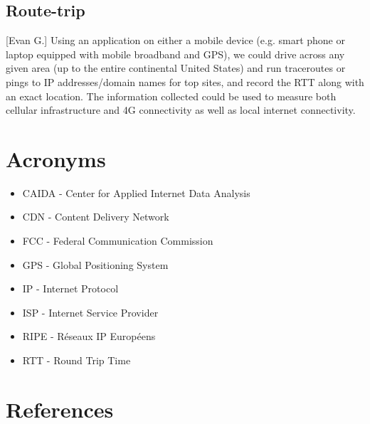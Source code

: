 \documentclass[12pt]{article}
\begin{document}
\subsection{Route-trip}[Evan G.]
Using an application on either a mobile device (e.g. smart phone or laptop equipped with mobile broadband and GPS), we could drive across any given area (up to the entire continental United States) and run traceroutes or pings to IP addresses/domain names for top sites, and record the RTT along with an exact location. The information collected could be used to measure both cellular infrastructure and 4G connectivity as well as local internet connectivity.

\newpage
\section{Acronyms}
\begin{itemize}
    \item CAIDA - Center for Applied Internet Data Analysis
    \item CDN - Content Delivery Network
    \item FCC - Federal Communication Commission
    \item GPS - Global Positioning System
    \item IP  - Internet Protocol
    \item ISP - Internet Service Provider
    \item RIPE - R\'eseaux IP Europ\'eens
    \item RTT - Round Trip Time
\end{itemize}

\newpage
\singlespacing

\section{References} %
\renewcommand{\section}[2]{}%



\end{document}
